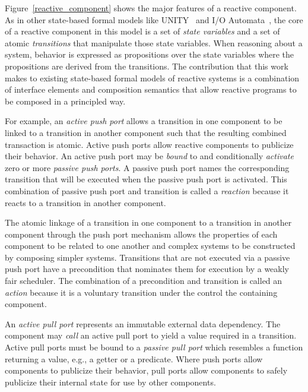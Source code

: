 Figure~\ref{reactive_component} shows the major features of a reactive component.
As in other state-based formal models like UNITY~\cite{chandy1989parallel} and I/O Automata~\cite{nancy1996distributed}, the core of a reactive component in this model is a set of \emph{state variables} and a set of atomic \emph{transitions} that manipulate those state variables.
When reasoning about a system, behavior is expressed as propositions over the state variables where the propositions are derived from the transitions.
The contribution that this work makes to existing state-based formal models of reactive systems is a combination of interface elements and composition semantics that allow reactive programs to be composed in a principled way.

For example, an \emph{active push port} allows a transition in one component to be linked to a transition in another component such that the resulting combined transaction is atomic.
Active push ports allow reactive components to publicize their behavior.
An active push port may be \emph{bound} to and conditionally \emph{activate} zero or more \emph{passive push ports}.
A passive push port names the corresponding transition that will be executed when the passive push port is activated.
This combination of passive push port and transition is called a \emph{reaction} because it reacts to a transition in another component.

The atomic linkage of a transition in one component to a transition in another component through the push port mechanism allows the properties of each component to be related to one another and complex systems to be constructed by composing simpler systems.
Transitions that are not executed via a passive push port have a precondition that nominates them for execution by a weakly fair scheduler.
The combination of a precondition and transition is called an \emph{action} because it is a voluntary transition under the control the containing component.

An \emph{active pull port} represents an immutable external data dependency.
The component may \emph{call} an active pull port to yield a value required in a transition.
Active pull ports must be bound to a \emph{passive pull port} which resembles a function returning a value, e.g., a getter or a predicate.
Where push ports allow components to publicize their behavior, pull ports allow components to safely publicize their internal state for use by other components.

